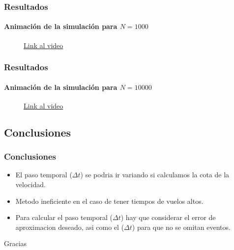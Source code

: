 \documentclass[hyperref={pdfpagelayout=SinglePage}]{beamer}
\begin{document}
\begin{frame}
\frametitle{Resultados}
\framesubtitle{Animación de la simulación para $N = 1000$}
\begin{figure}[H]
	\centering
	\href{https://youtu.be/hILxOjPESgA}{Link al video}
\end{figure}
\end{frame}

\begin{frame}
\frametitle{Resultados}
\framesubtitle{Animación de la simulación para $N = 10000$}
\begin{figure}[H]
	\centering
	\href{https://youtu.be/hILxOjPESgA}{Link al video}
\end{figure}
\end{frame}

\subsection{Conclusiones}

\begin{frame}
\frametitle{Conclusiones}
\begin{itemize}
	\item El paso temporal ($\Delta t$) se podria ir variando si calculamos la cota de la velocidad.
	\item Metodo ineficiente en el caso de tener tiempos de vuelos altos.
	\item Para calcular el paso temporal ($\Delta t$) hay que considerar el error de aproximacion deseado, asi como el ($\Delta t$) para que no se omitan eventos.
	\end{itemize}	
\end{frame}

\begin{frame}[plain,c]
\begin{center}
	\Huge Gracias
\end{center}
\end{frame}
    
\end{document}
